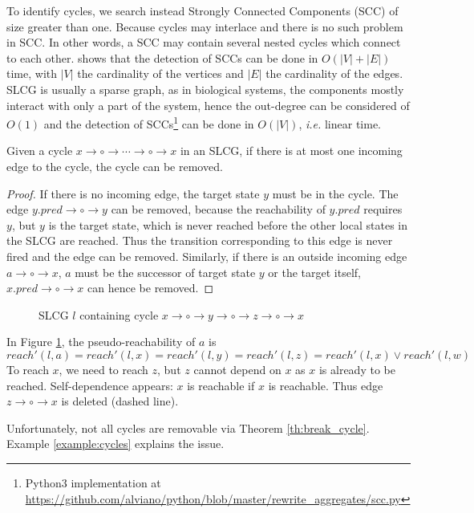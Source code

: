 To identify cycles, we search instead Strongly Connected Components (SCC) of size greater than one.
Because cycles may interlace and there is no such problem in SCC.
In other words, a SCC may contain several nested cycles which connect to each other.
\cite{tarjan1972} shows that the detection of SCCs can be done in $O (|V|+|E|)$ time, with $|V|$ the cardinality of the vertices and $|E|$ the cardinality of the edges.
SLCG is usually a sparse graph, as in biological systems, the components mostly interact with only a part of the system, hence the out-degree can be considered of $O (1)$ and the detection of SCCs\footnote{Python3 implementation at \url{https://github.com/alviano/python/blob/master/rewrite_aggregates/scc.py}} can be done in $O(|V|)$, \textit{i.e.} linear time.

\begin{theorem}\label{th:break_cycle}
Given a cycle $x\to \circ \to \cdots \to \circ \to x$ in an SLCG, if there is at most one incoming edge to the cycle, the cycle can be removed.
\end{theorem}
\begin{proof}
If there is no incoming edge, the target state $y$ must be in the cycle. 
The edge $y.pred\to\circ\to y$ can be removed, because the reachability of $y.pred$ requires $y$, but $y$ is the target state, which is never reached before the other local states in the SLCG are reached.
Thus the transition corresponding to this edge is never fired and the edge can be removed.
Similarly, if there is an outside incoming edge $a\to \circ \to x$, $a$ must be the successor of target state $y$ or the target itself, $x.pred\to\circ\to x$ can hence be removed.
\end{proof}
\begin{example}
    \begin{figure}[ht]
        \centering
        
        \caption[SLCG with cycles]{SLCG $l$ containing cycle $x\to \circ \to y \to \circ \to z\to \circ \to x$}
        \label{cycle1}
    \end{figure}
    
    In Figure \ref{cycle1}, the pseudo-reachability of $a$ is 
    $$reach'(l,a)=reach'(l,x)=reach'(l,y)=reach'(l,z)=reach'(l,x)\lor reach'(l,w)$$
    To reach $x$, we need to reach $z$, but $z$ cannot depend on $x$ as $x$ is already to be reached. 
    Self-dependence appears: $x$ is reachable if $x$ is reachable.
    Thus edge $z\to \circ \to x$ is deleted (dashed line).
\end{example}
Unfortunately, not all cycles are removable via Theorem \ref{th:break_cycle}. Example \ref{example:cycles} explains the issue.
